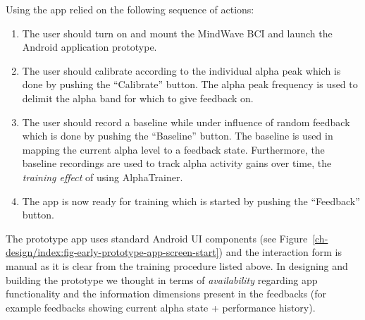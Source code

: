 \documentclass[a4paper,10pt,english,lof,lot,twoside]{puthesis}
\begin{document}
Using the app relied on the following sequence of actions:
\begin{enumerate}
\item {} 
The user should turn on and mount the MindWave BCI and launch the Android
application prototype.

\item {} 
The user should calibrate according to the individual alpha peak which is
done by pushing the ``Calibrate'' button. The alpha peak frequency is used to
delimit the alpha band for which to give feedback on.

\item {} 
The user should record a baseline while under influence of random feedback
which is done by pushing the ``Baseline'' button. The baseline is used in
mapping the current alpha level to a feedback state. Furthermore, the
baseline recordings are used to track alpha activity gains over time, the
\emph{training effect} of using AlphaTrainer.

\item {} 
The app is now ready for training which is started by pushing the ``Feedback''
button.

\end{enumerate}

The prototype app uses standard Android UI components (see Figure \ref{ch-design/index:fig-early-prototype-app-screen-start}) and the interaction form is manual
as it is clear from the training procedure listed above. In designing and
building the prototype we thought in terms of \emph{availability} regarding app
functionality and the information dimensions present in the feedbacks (for
example feedbacks showing current alpha state + performance history).
\end{document}
